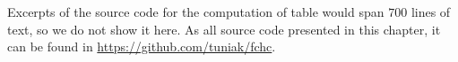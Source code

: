 Excerpts of the source code for the computation of table would span $700$ lines of text, so we do not show it here. As all source code presented in this chapter, it can be found in \url{https://github.com/tuniak/fchc}.
%   
%
%
%
%
%	
%
%
%
%
%
